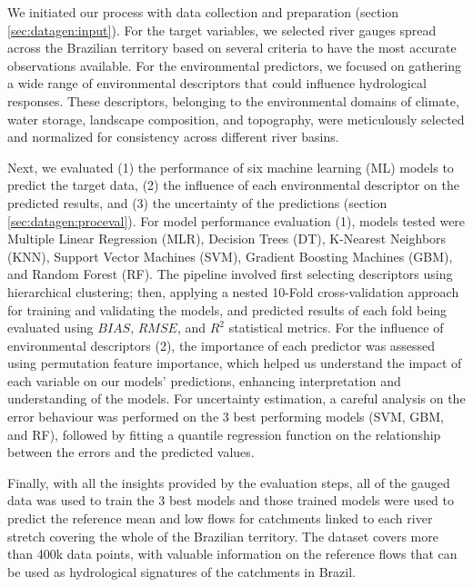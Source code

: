 \documentclass[12pt]{article}
\begin{document}
\par We initiated our process with data collection and preparation (section \ref{sec:datagen:input}). For the target variables, we selected river gauges spread across the Brazilian territory based on several criteria to have the most accurate observations available. For the environmental predictors, we focused on gathering a wide range of environmental descriptors that could influence hydrological responses. These descriptors, belonging to the environmental domains of climate, water storage, landscape composition, and topography, were meticulously selected and normalized for consistency across different river basins.

\par Next, we evaluated (1) the performance of six machine learning (ML) models to predict the target data, (2) the influence of each environmental descriptor on the predicted results, and (3) the uncertainty of the predictions (section \ref{sec:datagen:proceval}). For model performance evaluation (1), models tested were Multiple Linear Regression (MLR), Decision Trees (DT), K-Nearest Neighbors (KNN), Support Vector Machines (SVM), Gradient Boosting Machines (GBM), and Random Forest (RF). The pipeline involved first selecting descriptors using hierarchical clustering; then, applying a nested 10-Fold cross-validation approach for training and validating the models, and predicted results of each fold being evaluated using \( BIAS \), \( RMSE \), and \( R^2 \) statistical metrics. For the influence of environmental descriptors (2), the importance of each predictor was assessed using permutation feature importance, which helped us understand the impact of each variable on our models' predictions, enhancing interpretation and understanding of the models. For uncertainty estimation, a careful analysis on the error behaviour was performed on the 3 best performing models (SVM, GBM, and RF), followed by fitting a quantile regression function on the relationship between the errors and the predicted values.

\par Finally, with all the insights provided by the evaluation steps, all of the gauged data was used to train the 3 best models and those trained models were used to predict the reference mean and low flows for catchments linked to each river stretch covering the whole of the Brazilian territory. The dataset covers more than 400k data points, with valuable information on the reference flows that can be used as hydrological signatures of the catchments in Brazil.
\end{document}
